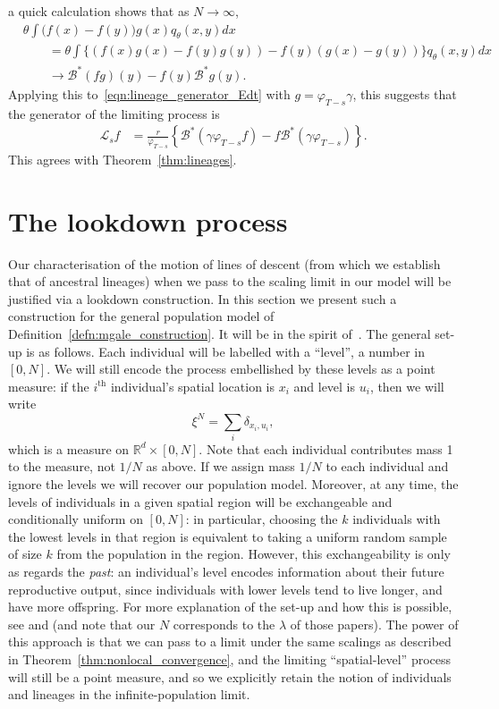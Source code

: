 \documentclass[EJP]{ejpecp} %
\newcommand{\IR}{\mathbb R}
\newcommand{\DG}{\mathcal{B}}  %
\newcommand{\Lgen}{\mathcal{L}}    %
\newcommand{\lp}{\xi}              %
\newcommand{\citet}[1]{\cite{#1}}
\begin{document}
a quick calculation shows that as $N \to \infty$,
\begin{align*}
    &
    \theta \int \big(f(x) - f(y)\big) g(x) q_\theta(x, y) dx \\
    &\qquad =
    \theta \int \big\{
        (f(x) g(x) - f(y) g(y)) - f(y) (g(x) - g(y))
    \big\} q_\theta(x, y) dx \\
    &\qquad \to
        \DG^*(fg)(y) - f(y) \DG^* g(y) . 
\end{align*}
Applying this to~\eqref{eqn:lineage_generator_Edt} with $g = \varphi_{T-s} \gamma$,
this suggests that the generator of the limiting process is
\begin{align} \label{eqn:heuristic_lineage_generator}
    \Lgen_s f
    &=
    \frac{r}{\varphi_{T-s}}
    \left\{
        \DG^*(\gamma \varphi_{T-s} f) - f \DG^*(\gamma \varphi_{T-s})
    \right\} .
\end{align}
This agrees with Theorem~\ref{thm:lineages}.


\section{The lookdown process}
    \label{sec:lookdown}

Our characterisation of the motion of lines of descent (from which we establish
that of ancestral lineages) when we pass
to the scaling limit in our model will be justified via a lookdown construction.
In this section 
we present such a construction for the general population model 
of Definition~\ref{defn:mgale_construction}. It will be
in the spirit of~\cite{kurtz/rodrigues:2011}. 
The general set-up is as follows.
Each individual will be labelled with a ``level'', a number in $[0, N]$.
We will still encode the process embellished by these levels
as a point measure:
if the $i^\mathrm{th}$ individual's spatial location is $x_i$
and level is $u_i$, then we will write
\[
    \lp^N = \sum_i \delta_{x_i, u_i} ,
\]
which is a measure on $\IR^d \times [0, N]$.
Note that each individual contributes mass 1 to the measure,
not $1/N$ as above. If we assign mass $1/N$ to each individual and 
ignore the levels we will recover our population model. 
Moreover, at any time, the levels of 
individuals in a given spatial region 
will be exchangeable and conditionally uniform on $[0, N]$:
in particular, choosing the $k$ individuals with the lowest levels 
in that region
is equivalent to taking a uniform random sample of size $k$ 
from the population in the region.
However, this exchangeability is only as regards the \emph{past}:
an individual's level encodes information about their future reproductive output,
since individuals with lower levels tend to live longer, and have more offspring.
For more explanation of the set-up and how this is possible,
see \citet{kurtz/rodrigues:2011} and \citet{etheridge/kurtz:2019} 
(and note that our $N$ corresponds to the $\lambda$ of those papers).
The power of this approach is that we can pass to a limit under the
same scalings as described in Theorem~\ref{thm:nonlocal_convergence}, 
and 
the limiting ``spatial-level'' process will still be a point measure,
and so we explicitly retain the notion of individuals and lineages
in the infinite-population limit.
\end{document}
